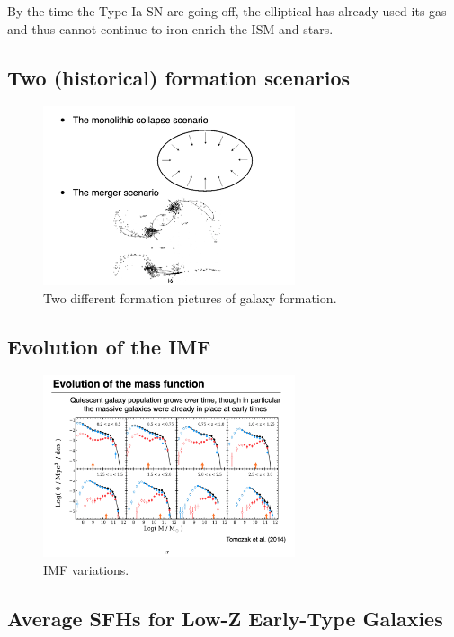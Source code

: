 \documentclass{article}
\begin{document}
By the time the Type Ia SN are going off, the elliptical has already used its gas and thus cannot continue to iron-enrich the ISM and stars. 

\subsection{Two (historical) formation scenarios}

\begin{figure}
    \centering
    \includegraphics[width=0.66\textwidth]{figs/Screen Shot 2021-10-20 at 10.44.05 AM.png}
    \caption{Two different formation pictures of galaxy formation.}
    \label{fig:gal_form}
\end{figure}

\subsection{Evolution of the IMF}

\begin{figure}
    \centering
    \includegraphics[width=0.66\textwidth]{figs/Screen Shot 2021-10-20 at 10.45.07 AM.png}
    \caption{IMF variations.}
    \label{fig:IMF_variations}
\end{figure}

\subsection{Average SFHs for Low-Z Early-Type Galaxies}
\end{document}
